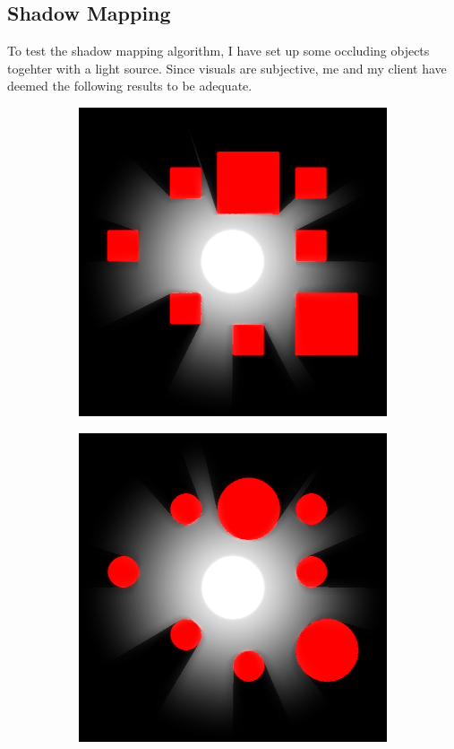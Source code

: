 \documentclass[../main/main.tex]{subfiles}
\begin{document}
\subsection{Shadow Mapping}
To test the shadow mapping algorithm, I have set up some occluding objects togehter with a light source. Since visuals are subjective, me and my client have deemed the following results to be adequate.

\begin{figure}[H]
    \centering

    \begin{subfigure}[b]{0.3\columnwidth}
    \includegraphics[width=\columnwidth]{../testing/assets/rays_example_1.png}
    \end{subfigure}
    \begin{subfigure}[b]{0.3\columnwidth}
    \includegraphics[width=\columnwidth]{../testing/assets/rays_example_2.png}

\end{subfigure}
\end{figure}
\end{document}

